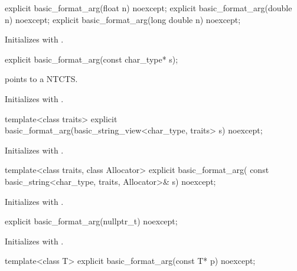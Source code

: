 \begin{itemdecl}
explicit basic_format_arg(float n) noexcept;
explicit basic_format_arg(double n) noexcept;
explicit basic_format_arg(long double n) noexcept;
\end{itemdecl}

\begin{itemdescr}
\pnum
\effects
Initializes  with .
\end{itemdescr}

\begin{itemdecl}
explicit basic_format_arg(const char_type* s);
\end{itemdecl}

\begin{itemdescr}
\pnum
\expects
{} points to a NTCTS.

\pnum
\effects
Initializes  with .
\end{itemdescr}

\begin{itemdecl}
template<class traits>
  explicit basic_format_arg(basic_string_view<char_type, traits> s) noexcept;
\end{itemdecl}

\begin{itemdescr}
\pnum
\effects
Initializes  with .
\end{itemdescr}

\begin{itemdecl}
template<class traits, class Allocator>
  explicit basic_format_arg(
    const basic_string<char_type, traits, Allocator>& s) noexcept;
\end{itemdecl}

\begin{itemdescr}
\pnum
\effects
Initializes  with
.
\end{itemdescr}

\begin{itemdecl}
explicit basic_format_arg(nullptr_t) noexcept;
\end{itemdecl}

\begin{itemdescr}
\pnum
\effects
Initializes  with
  .
\end{itemdescr}

\begin{itemdecl}
template<class T> explicit basic_format_arg(const T* p) noexcept;
\end{itemdecl}

